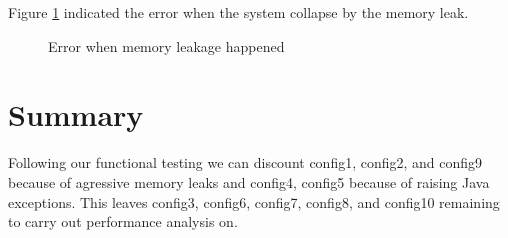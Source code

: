 Figure \ref{config2_2} indicated the error when the system collapse by the memory leak.

\begin{figure}[ht]
 \centering
 \caption{Error when memory leakage happened}
 \label{config2_2}
\end{figure}

\section{Summary}

Following our functional testing we can discount config1, config2, and config9 because of agressive memory leaks and config4, config5 because of raising Java exceptions. This leaves config3, config6, config7, config8, and config10 remaining to carry out performance analysis on.